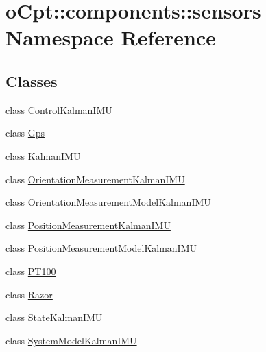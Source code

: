 \hypertarget{namespaceo_cpt_1_1components_1_1sensors}{}\section{o\+Cpt\+:\+:components\+:\+:sensors Namespace Reference}
\label{namespaceo_cpt_1_1components_1_1sensors}
\subsection*{Classes}
\begin{DoxyCompactItemize}
\item 
class \hyperlink{classo_cpt_1_1components_1_1sensors_1_1_control_kalman_i_m_u}{Control\+Kalman\+I\+MU}
\item 
class \hyperlink{classo_cpt_1_1components_1_1sensors_1_1_gps}{Gps}
\item 
class \hyperlink{classo_cpt_1_1components_1_1sensors_1_1_kalman_i_m_u}{Kalman\+I\+MU}
\item 
class \hyperlink{classo_cpt_1_1components_1_1sensors_1_1_orientation_measurement_kalman_i_m_u}{Orientation\+Measurement\+Kalman\+I\+MU}
\item 
class \hyperlink{classo_cpt_1_1components_1_1sensors_1_1_orientation_measurement_model_kalman_i_m_u}{Orientation\+Measurement\+Model\+Kalman\+I\+MU}
\item 
class \hyperlink{classo_cpt_1_1components_1_1sensors_1_1_position_measurement_kalman_i_m_u}{Position\+Measurement\+Kalman\+I\+MU}
\item 
class \hyperlink{classo_cpt_1_1components_1_1sensors_1_1_position_measurement_model_kalman_i_m_u}{Position\+Measurement\+Model\+Kalman\+I\+MU}
\item 
class \hyperlink{classo_cpt_1_1components_1_1sensors_1_1_p_t100}{P\+T100}
\item 
class \hyperlink{classo_cpt_1_1components_1_1sensors_1_1_razor}{Razor}
\item 
class \hyperlink{classo_cpt_1_1components_1_1sensors_1_1_state_kalman_i_m_u}{State\+Kalman\+I\+MU}
\item 
class \hyperlink{classo_cpt_1_1components_1_1sensors_1_1_system_model_kalman_i_m_u}{System\+Model\+Kalman\+I\+MU}
\end{DoxyCompactItemize}
